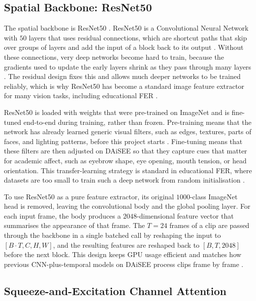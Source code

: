 \subsection{Spatial Backbone: ResNet50}\label{sec:method_resnet}

The spatial backbone is ResNet50 \cite{he_resnet_2016}. ResNet50 is a Convolutional Neural Network with $50$ layers that uses residual connections, which are shortcut paths that skip over groups of layers and add the input of a block back to its output \cite{he_resnet_2016}. Without these connections, very deep networks become hard to train, because the gradients used to update the early layers shrink as they pass through many layers \cite{he_resnet_2016}. The residual design fixes this and allows much deeper networks to be trained reliably, which is why ResNet50 has become a standard image feature extractor for many vision tasks, including educational FER \cite{asaju_adaptive_2022,asaju_affects_2021,gupta_edfa_2023,aly_revolutionizing_2025}.

ResNet50 is loaded with weights that were pre-trained on ImageNet and is fine-tuned end-to-end during training, rather than frozen. Pre-training means that the network has already learned generic visual filters, such as edges, textures, parts of faces, and lighting patterns, before this project starts \cite{he_resnet_2016}. Fine-tuning means that these filters are then adjusted on DAiSEE so that they capture cues that matter for academic affect, such as eyebrow shape, eye opening, mouth tension, or head orientation. This transfer-learning strategy is standard in educational FER, where datasets are too small to train such a deep network from random initialisation \cite{komaravalli_detecting_2023,gupta_edfa_2023,aly_revolutionizing_2025}.

To use ResNet50 as a pure feature extractor, its original $1000$-class ImageNet head is removed, leaving the convolutional body and the global pooling layer. For each input frame, the body produces a $2048$-dimensional feature vector that summarises the appearance of that frame. The $T = 24$ frames of a clip are passed through the backbone in a single batched call by reshaping the input to $[B \cdot T, C, H, W]$, and the resulting features are reshaped back to $[B, T, 2048]$ before the next block. This design keeps GPU usage efficient and matches how previous CNN-plus-temporal models on DAiSEE process clips frame by frame \cite{abedi_improving_2021,asaju_adaptive_2022,shiri_detection_2024}.

\subsection{Squeeze-and-Excitation Channel Attention}\label{sec:method_se}

